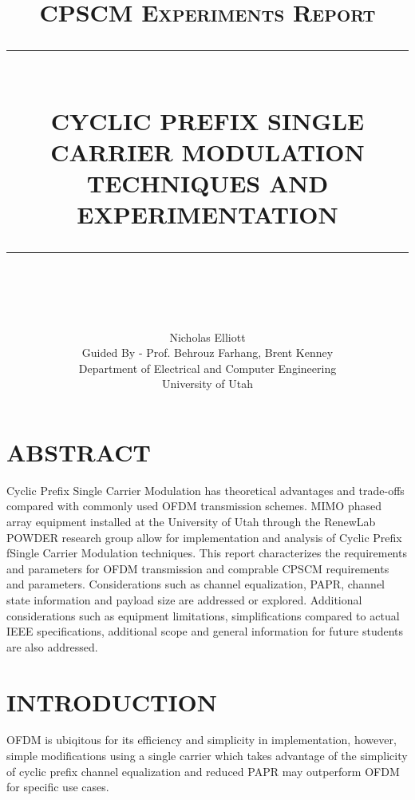 \documentclass[12pt]{report}
\newcommand{\HRule}[1]{\rule{\linewidth}{#1}}
\begin{document}
\title{ \normalsize \textsc{CPSCM Experiments Report}
		\\ [2.0cm]
		\HRule{0.5pt} \\
		\LARGE \textbf{\uppercase{Cyclic Prefix Single Carrier Modulation Techniques and Experimentation}}
		\HRule{2pt} \\ [0.5cm]
		\normalsize  \vspace*{5\baselineskip}}

\date{}

\author{
		Nicholas Elliott \\
                Guided By - Prof. Behrouz Farhang, Brent Kenney  \\                
Department of Electrical and Computer Engineering\\
University of Utah\\ }

\maketitle

\newpage
\section*{ABSTRACT}

Cyclic Prefix Single Carrier Modulation has theoretical advantages and trade-offs compared with
commonly used OFDM transmission schemes.  MIMO phased array equipment installed at the University of
Utah through the RenewLab POWDER research group allow for implementation and analysis of Cyclic Prefix
fSingle Carrier Modulation techniques.  This report characterizes the requirements and parameters for
OFDM transmission and comprable CPSCM requirements and parameters.  Considerations such as channel equalization, PAPR, channel state information and payload size are addressed or explored.  Additional considerations such as equipment limitations, simplifications compared to actual IEEE specifications, additional scope and general information for future students are also addressed.

\section*{INTRODUCTION}
OFDM is ubiqitous for its efficiency and simplicity in implementation, however, simple modifications using
a single carrier which takes advantage of the simplicity of cyclic prefix channel equalization and reduced PAPR
may outperform OFDM for specific use cases.
\end{document}
